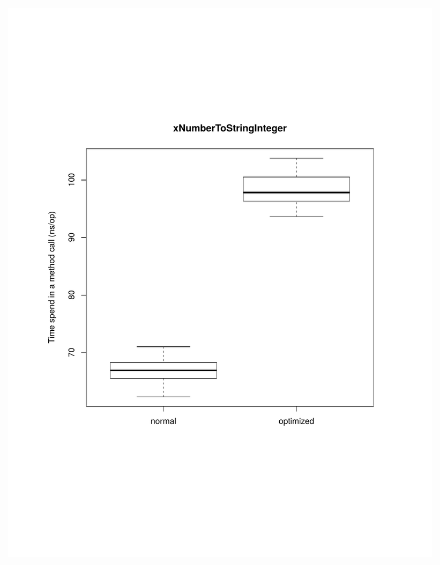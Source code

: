 \begin{figure}[H]
	\centering

	\centerline{
		\includegraphics[trim=0mm 60mm 20mm 50mm,scale=0.50]{pictures/boxplot_xNumberToStringInteger.pdf}
}
\end{figure}
